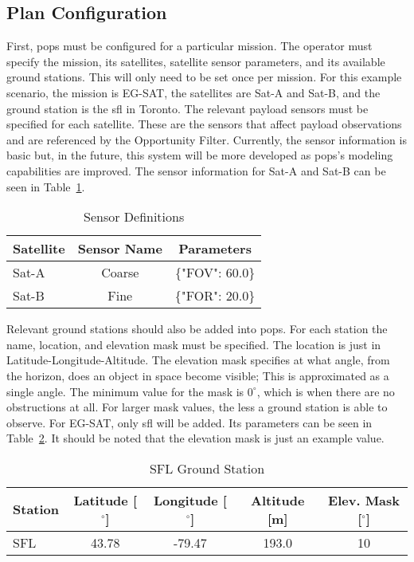 \subsection{Plan Configuration}

First, \gls{pops} must be configured for a particular mission. The operator
must specify the mission, its satellites, satellite sensor parameters, and its
available ground stations. This will only need to be set once per mission. For
this example scenario, the mission is EG-SAT, the satellites are Sat-A and
Sat-B, and the ground station is the \gls{sfl} in Toronto. The relevant payload
sensors must be specified for each satellite. These are the sensors that affect
payload observations and are referenced by the Opportunity Filter. Currently,
the sensor information is basic but, in the future, this system will be more
developed as \gls{pops}'s modeling capabilities are improved. The sensor
information for Sat-A and Sat-B can be seen in Table~\ref{tab:sensors}. 

\begin{table}[h] 
    \centering
    \caption{Sensor Definitions}
    \begin{tabular}{ccc}
	Satellite                  & Sensor Name & Parameters    \\ \hline
	\multicolumn{1}{l|}{Sat-A} & Coarse      & \{"FOV": 60.0\} \\
	\multicolumn{1}{l|}{Sat-B} & Fine        & \{"FOR": 20.0\}
    \end{tabular}
    \label{tab:sensors}
\end{table}

Relevant ground stations should also be added into \gls{pops}. For each station
the name, location, and elevation mask must be specified. The location is just
in Latitude-Longitude-Altitude. The elevation mask specifies at what angle,
from the horizon, does an object in space become visible; This is approximated
as a single angle. The minimum value for the mask is $0^\circ$, which is when
there are no obstructions at all. For larger mask values, the less a ground
station is able to observe. For EG-SAT, only \gls{sfl} will be added. Its
parameters can be seen in Table~\ref{tab:ground-stations}. It should be noted
that the elevation mask is just an example value.

\begin{table}[h] 
    \centering
    \caption{SFL Ground Station}
    \begin{tabular}{ccccc}
	Station                  & Latitude [$^\circ$] & Longitude [$^\circ$] & Altitude [m] & Elev. Mask [$^\circ$] \\ \hline
	\multicolumn{1}{l|}{SFL} & 43.78   & -79.47   & 193.0  & 10      \\
    \end{tabular}
    \label{tab:ground-stations}
\end{table}

